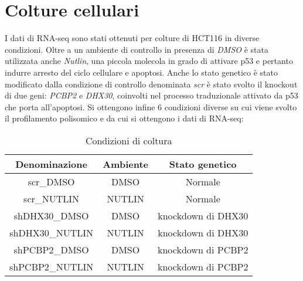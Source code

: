 \section{Colture cellulari}
I dati di RNA-seq sono stati ottenuti per colture di HCT116 in diverse condizioni.
Oltre a un ambiente di controllo in presenza di \emph{DMSO} \`e stata utilizzata anche \emph{Nutlin}, una piccola molecola in grado di attivare p53 e pertanto indurre arresto del ciclo cellulare e apoptosi.
Anche lo stato genetico \`e stato modificato dalla condizione di controllo denominata \emph{scr} \`e stato svolto il knockout di due geni: \emph{PCBP2} e \emph{DHX30}, coinvolti nel processo traduzionale attivato da p53 che porta all'apoptosi.
Si ottengono infine $6$ condizioni diverse su cui viene svolto il profilamento polisomico e da cui si ottengono i dati di RNA-seq:
\begin{table}[H]
  \begin{tabular}{|c|c|c|}
    \hline
    Denominazione & Ambiente & Stato genetico\\
    \hline
    scr\_DMSO & DMSO & Normale\\
    \hline
    scr\_NUTLIN & NUTLIN & Normale\\
    \hline
    shDHX30\_DMSO & DMSO & knockdown di DHX30\\
    \hline
    shDHX30\_NUTLIN & NUTLIN & knockdown di DHX30\\
    \hline
    shPCBP2\_DMSO & DMSO & knockdown di PCBP2\\
    \hline
    shPCBP2\_NUTLIN & NUTLIN & knockdown di PCBP2\\
    \hline
  \end{tabular}
  \centering
  \caption{Condizioni di coltura}
  \label{tab:concolture}
\end{table}



